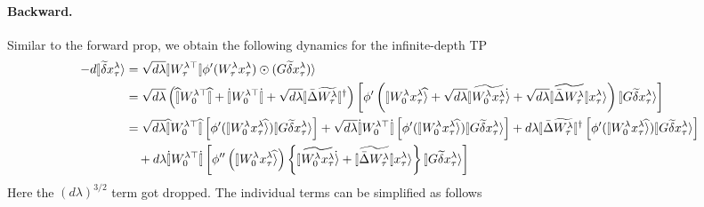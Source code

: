 \documentclass{article}
\theoremstyle{plain}
\theoremstyle{definition}
\begin{document}
\paragraph{Backward.} Similar to the forward prop, we obtain the following dynamics for the infinite-depth TP
\begin{align*}
-d\ket{\tilde\delta x_{\tau}^{\lambda}} & =\sqrt{d\lambda}\oplim{W_{\tau}^{\lambda\trsp}}\phi'(W_{\tau}^{\lambda}x_{\tau}^{\lambda})\odot(G\tilde\delta x_{\tau}^{\lambda})\ra\\
 & =\sqrt{d\lambda}\left(\hatoplim{W_{0}^{\lambda\trsp}}+\dotoplim{W_{0}^{\lambda\trsp}}+\sqrt{d\lambda}\oplim{\bar{\Delta}\widetilde{W_{\tau}^{\lambda}}}^{\dagger}\right)\left[\phi'\left(\hatket{W_{0}^{\lambda}x_{\tau}^{\lambda}}+\sqrt{d\lambda}\dotket{\widetilde{W_{0}^{\lambda}x_{\tau}^{\lambda}}}+\sqrt{d\lambda}\oplim{\widetilde{\bar{\Delta}W_{\tau}^{\lambda}}}x_{\tau}^{\lambda}\ra\right)\ket{G\tilde\delta x_{\tau}^{\lambda}}\right]\\
 & =\sqrt{d\lambda}\hatoplim{W_{0}^{\lambda\trsp}}\left[\phi'(\hatket{W_{0}^{\lambda}x_{\tau}^{\lambda}})\ket{G\tilde\delta x_{\tau}^{\lambda}}\right]+\sqrt{d\lambda}\dotoplim{W_{0}^{\lambda\trsp}}\left[\phi'(\hatket{W_{0}^{\lambda}x_{\tau}^{\lambda}})\ket{G\tilde\delta x_{\tau}^{\lambda}}\right]+d\lambda\oplim{\bar{\Delta}\widetilde{W_{\tau}^{\lambda}}}^{\dagger}\left[\phi'(\hatket{W_{0}^{\lambda}x_{\tau}^{\lambda}})\ket{G\tilde\delta x_{\tau}^{\lambda}}\right]\\
 & \quad+d\lambda\dotoplim{W_{0}^{\lambda\trsp}}\left[\phi''\left(\hatket{W_{0}^{\lambda}x_{\tau}^{\lambda}}\right)\left\{ \dotket{\widetilde{W_{0}^{\lambda}x_{\tau}^{\lambda}}}+\oplim{\widetilde{\bar{\Delta}W_{\tau}^{\lambda}}}x_{\tau}^{\lambda}\ra\right\} \ket{G\tilde\delta x_{\tau}^{\lambda}}\right]
\end{align*}
Here the $(d\lambda)^{3/2}$ term got dropped. The individual terms
can be simplified as follows
\end{document}
